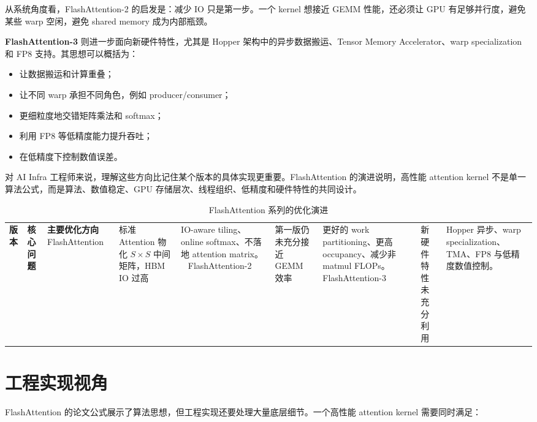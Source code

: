 从系统角度看，FlashAttention-2 的启发是：减少 IO 只是第一步。一个 kernel 想接近 GEMM 性能，还必须让 GPU 有足够并行度，避免某些 warp 空闲，避免 shared memory 成为内部瓶颈。

\textbf{FlashAttention-3} 则进一步面向新硬件特性，尤其是 Hopper 架构中的异步数据搬运、Tensor Memory Accelerator、warp specialization 和 FP8 支持。其思想可以概括为：

\begin{itemize}
\item 让数据搬运和计算重叠；
\item 让不同 warp 承担不同角色，例如 producer/consumer；
\item 更细粒度地交错矩阵乘法和 softmax；
\item 利用 FP8 等低精度能力提升吞吐；
\item 在低精度下控制数值误差。
\end{itemize}

对 AI Infra 工程师来说，理解这些方向比记住某个版本的具体实现更重要。FlashAttention 的演进说明，高性能 attention kernel 不是单一算法公式，而是算法、数值稳定、GPU 存储层次、线程组织、低精度和硬件特性的共同设计。

\begin{table}[H]
\centering
\small
\caption{FlashAttention 系列的优化演进}
\label{tab:flashattention-evolution}
\begin{tabular}{p{}p{}p{}}
\toprule
\textbf{版本} & \textbf{核心问题} & \textbf{主要优化方向} \
\midrule
FlashAttention
& 标准 Attention 物化 $S\times S$ 中间矩阵，HBM IO 过高
& IO-aware tiling、online softmax、不落地 attention matrix。 \
\midrule
FlashAttention-2
& 第一版仍未充分接近 GEMM 效率
& 更好的 work partitioning、更高 occupancy、减少非 matmul FLOPs。 \
\midrule
FlashAttention-3
& 新硬件特性未充分利用
& Hopper 异步、warp specialization、TMA、FP8 与低精度数值控制。 \
\bottomrule
\end{tabular}
\end{table}

\section{工程实现视角}
\label{sec:flashattention-engineering-view}

FlashAttention 的论文公式展示了算法思想，但工程实现还要处理大量底层细节。一个高性能 attention kernel 需要同时满足：

